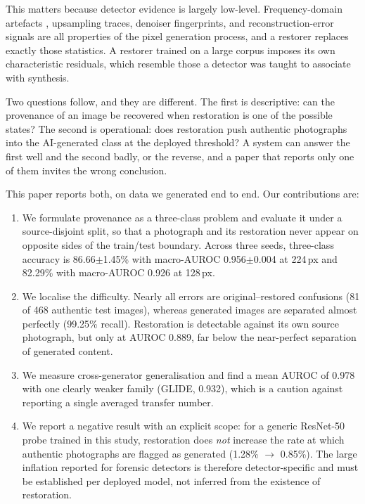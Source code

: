﻿\documentclass[graybox,norunningheads]{svmult}
\begin{document}
This matters because detector evidence is largely low-level. Frequency-domain
artefacts \cite{frank2020frequency}, upsampling traces, denoiser fingerprints, and
reconstruction-error signals \cite{wang2023dire} are all properties of the pixel
generation process, and a restorer replaces exactly those statistics. A restorer
trained on a large corpus imposes its own characteristic residuals, which resemble
those a detector was taught to associate with synthesis.

Two questions follow, and they are different. The first is descriptive: can the
provenance of an image be recovered when restoration is one of the possible states?
The second is operational: does restoration push authentic photographs into the
AI-generated class at the deployed threshold? A system can answer the first well and
the second badly, or the reverse, and a paper that reports only one of them invites
the wrong conclusion.

This paper reports both, on data we generated end to end. Our contributions are:

\begin{enumerate}
\item We formulate provenance as a three-class problem and evaluate it under a
source-disjoint split, so that a photograph and its restoration never appear on
opposite sides of the train/test boundary. Across three seeds, three-class
accuracy is 86.66$\pm$1.45\% with macro-AUROC 0.956$\pm$0.004 at 224\,px and
82.29\% with macro-AUROC 0.926 at 128\,px.
\item We localise the difficulty. Nearly all errors are original--restored
confusions (81 of 468 authentic test images), whereas generated images are
separated almost perfectly (99.25\% recall). Restoration is detectable against its
own source photograph, but only at AUROC 0.889, far below the near-perfect
separation of generated content.
\item We measure cross-generator generalisation and find a mean AUROC of 0.978 with
one clearly weaker family (GLIDE, 0.932), which is a caution against reporting a
single averaged transfer number.
\item We report a negative result with an explicit scope: for a generic ResNet-50
probe trained in this study, restoration does \emph{not} increase the rate at which
authentic photographs are flagged as generated (1.28\% $\rightarrow$ 0.85\%). The
large inflation reported for forensic detectors is therefore detector-specific and
must be established per deployed model, not inferred from the existence of
restoration.
\end{enumerate}
\end{document}
